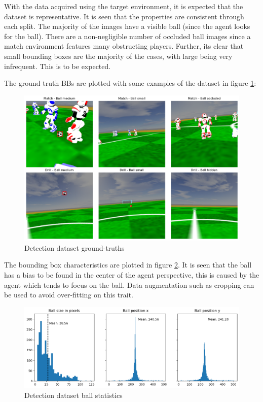 \documentclass[a4paper,twoside,12pt]{report}
\begin{document}
With the data acquired using the target environment, it is expected that the dataset is representative. It is seen that the properties are consistent through each split. The majority of the images have a visible ball (since the agent looks for the ball). There are a non-negligible number of occluded ball images since a match environment features many obstructing players. Further, its clear that small bounding boxes are the majority of the cases, with large being very infrequent. This is to be expected.

The ground truth BBs are plotted with some examples of the dataset in figure \ref{fig:detectimages}:

\begin{figure}[h!]
\begin{center}
\includegraphics[width=16cm]{images/imagedetections.png}
\caption{Detection dataset ground-truths}
\label{fig:detectimages}
\end{center}
\end{figure}

The bounding box characteristics are plotted in figure \ref{fig:detectplot}. It is seen that the ball has a bias to be found in the center of the agent perspective, this is caused by the agent which tends to focus on the ball. Data augmentation such as cropping can be used to avoid over-fitting on this trait.

\begin{figure}[h!]
\begin{center}
\includegraphics[width=15cm]{images/plotdetections.png}
\caption{Detection dataset ball statistics}
\label{fig:detectplot}
\end{center}
\end{figure}
\end{document}
